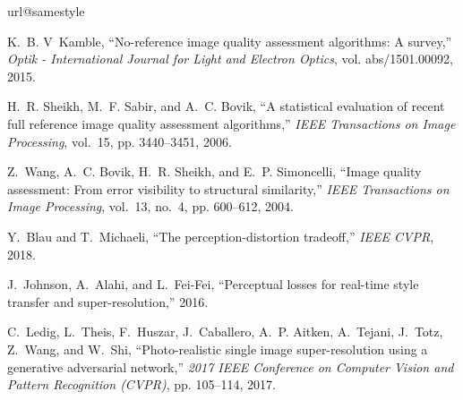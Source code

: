 \documentclass[10pt,twocolumn,letterpaper]{article}
\begin{document}

{%
\begin{thebibliography}{10}
\providecommand{\url}[1]{#1}
\csname url@samestyle\endcsname
\providecommand{\newblock}{\relax}
\providecommand{\bibinfo}[2]{#2}
\providecommand{\BIBentrySTDinterwordspacing}{\spaceskip=0pt\relax}
\providecommand{\BIBentryALTinterwordstretchfactor}{4}
\providecommand{\BIBentryALTinterwordspacing}{\spaceskip=\fontdimen2\font plus
\BIBentryALTinterwordstretchfactor\fontdimen3\font minus
  \fontdimen4\font\relax}
\providecommand{\BIBforeignlanguage}[2]{{%
\expandafter\ifx\csname l@#1\endcsname\relax
\typeout{** WARNING: IEEEtran.bst: No hyphenation pattern has been}%
\typeout{** loaded for the language `#1'. Using the pattern for}%
\typeout{** the default language instead.}%
\else
\language=\csname l@#1\endcsname
\fi
#2}}
\providecommand{\BIBdecl}{\relax}
\BIBdecl

K.~B. V~Kamble, ``No-reference image quality assessment algorithms: A survey,''
  \emph{Optik - International Journal for Light and Electron Optics}, vol.
  abs/1501.00092, 2015.

H.~R. Sheikh, M.~F. Sabir, and A.~C. Bovik, ``A statistical evaluation of
  recent full reference image quality assessment algorithms,'' \emph{IEEE
  Transactions on Image Processing}, vol.~15, pp. 3440--3451, 2006.

Z.~Wang, A.~C. Bovik, H.~R. Sheikh, and E.~P. Simoncelli, ``Image quality
  assessment: From error visibility to structural similarity,'' \emph{IEEE
  Transactions on Image Processing}, vol.~13, no.~4, pp. 600--612, 2004.

Y.~Blau and T.~Michaeli, ``The perception-distortion tradeoff,'' \emph{IEEE
  CVPR}, 2018.

J.~Johnson, A.~Alahi, and L.~Fei-Fei, ``Perceptual losses for real-time style
  transfer and super-resolution,'' 2016.

C.~Ledig, L.~Theis, F.~Huszar, J.~Caballero, A.~P. Aitken, A.~Tejani, J.~Totz,
  Z.~Wang, and W.~Shi, ``Photo-realistic single image super-resolution using a
  generative adversarial network,'' \emph{2017 IEEE Conference on Computer
  Vision and Pattern Recognition (CVPR)}, pp. 105--114, 2017.


\end{thebibliography}}
\end{document}
